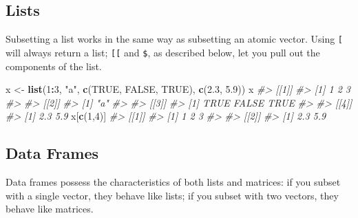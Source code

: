 \documentclass[]{book}
\newenvironment{Shaded}{\begin{snugshade}}{\end{snugshade}}
\newcommand{\KeywordTok}[1]{\textcolor[rgb]{0.13,0.29,0.53}{\textbf{#1}}}
\newcommand{\DecValTok}[1]{\textcolor[rgb]{0.00,0.00,0.81}{#1}}
\newcommand{\FloatTok}[1]{\textcolor[rgb]{0.00,0.00,0.81}{#1}}
\newcommand{\StringTok}[1]{\textcolor[rgb]{0.31,0.60,0.02}{#1}}
\newcommand{\CommentTok}[1]{\textcolor[rgb]{0.56,0.35,0.01}{\textit{#1}}}
\newcommand{\OtherTok}[1]{\textcolor[rgb]{0.56,0.35,0.01}{#1}}
\newcommand{\OperatorTok}[1]{\textcolor[rgb]{0.81,0.36,0.00}{\textbf{#1}}}
\newcommand{\NormalTok}[1]{#1}
\theoremstyle{definition}
\theoremstyle{definition}
\theoremstyle{definition}
\theoremstyle{remark}
\begin{document}
\subsection{Lists}\label{lists-1}

Subsetting a list works in the same way as subsetting an atomic vector.
Using \texttt{{[}} will always return a list; \texttt{{[}{[}} and
\texttt{\$}, as described below, let you pull out the components of the
list.

\begin{Shaded}
\begin{Highlighting}[]
\NormalTok{x <-}\StringTok{ }\KeywordTok{list}\NormalTok{(}\DecValTok{1}\OperatorTok{:}\DecValTok{3}\NormalTok{, }\StringTok{"a"}\NormalTok{, }\KeywordTok{c}\NormalTok{(}\OtherTok{TRUE}\NormalTok{, }\OtherTok{FALSE}\NormalTok{, }\OtherTok{TRUE}\NormalTok{), }\KeywordTok{c}\NormalTok{(}\FloatTok{2.3}\NormalTok{, }\FloatTok{5.9}\NormalTok{))}
\NormalTok{x}
\CommentTok{#> [[1]]}
\CommentTok{#> [1] 1 2 3}
\CommentTok{#> }
\CommentTok{#> [[2]]}
\CommentTok{#> [1] "a"}
\CommentTok{#> }
\CommentTok{#> [[3]]}
\CommentTok{#> [1]  TRUE FALSE  TRUE}
\CommentTok{#> }
\CommentTok{#> [[4]]}
\CommentTok{#> [1] 2.3 5.9}
\NormalTok{x[}\KeywordTok{c}\NormalTok{(}\DecValTok{1}\NormalTok{,}\DecValTok{4}\NormalTok{)]}
\CommentTok{#> [[1]]}
\CommentTok{#> [1] 1 2 3}
\CommentTok{#> }
\CommentTok{#> [[2]]}
\CommentTok{#> [1] 2.3 5.9}
\end{Highlighting}
\end{Shaded}

\subsection{Data Frames}\label{data-frames-1}

Data frames possess the characteristics of both lists and matrices: if
you subset with a single vector, they behave like lists; if you subset
with two vectors, they behave like matrices.
\end{document}
